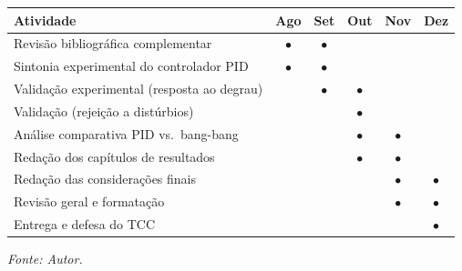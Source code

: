 \documentclass[repeatfields,xlists,xpacks,oneside]{ufrgscca}
\newcommand{\fonte}[1]{\par\centering\footnotesize\textit{Fonte: #1}\par}
\begin{document}
\begin{quadro}[htb]
\caption{Cronograma de atividades para o segundo semestre de 2026.}
\label{quad:cronograma}
\centering
\begin{tabular}{lccccc}
\hline
\textbf{Atividade} & \textbf{Ago} & \textbf{Set} & \textbf{Out} & \textbf{Nov} & \textbf{Dez} \\
\hline
Revisão bibliográfica complementar          & $\bullet$ & $\bullet$ &           &           &           \\
Sintonia experimental do controlador PID    & $\bullet$ & $\bullet$ &           &           &           \\
Validação experimental (resposta ao degrau) &           & $\bullet$ & $\bullet$ &           &           \\
Validação (rejeição a distúrbios)           &           &           & $\bullet$ &           &           \\
Análise comparativa PID vs.\ bang-bang      &           &           & $\bullet$ & $\bullet$ &           \\
Redação dos capítulos de resultados         &           &           & $\bullet$ & $\bullet$ &           \\
Redação das considerações finais            &           &           &           & $\bullet$ & $\bullet$ \\
Revisão geral e formatação                  &           &           &           & $\bullet$ & $\bullet$ \\
Entrega e defesa do TCC                     &           &           &           &           & $\bullet$ \\
\hline
\end{tabular}
\fonte{Autor.}
\end{quadro}


\printbibliography
\end{document}
